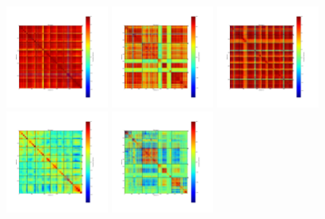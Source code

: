 \begin{figure}[ht] %
\begin{center}
\includegraphics[width=0.3\textwidth]{Figures/DarkTests/corrmat_TOI_array_1_20160504s97.pdf}
\includegraphics[width=0.3\textwidth]{Figures/DarkTests/corrmat_TOI_array_2_20160504s97.pdf}
\includegraphics[width=0.3\textwidth]{Figures/DarkTests/corrmat_TOI_array_3_20160504s97.pdf}
\includegraphics[width=0.3\textwidth]{Figures/DarkTests/corrmat_TOI_CM_array_1_20160504s97.pdf}
\includegraphics[width=0.3\textwidth]{Figures/DarkTests/corrmat_TOI_CM_array_2_20160504s97.pdf}

\end{center}
\end{figure}
